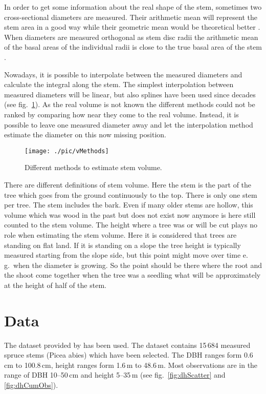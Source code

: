 \documentclass[twocolumn]{scrartcl}
\begin{document}
In order to get some information about the real shape of the stem, sometimes two
cross-sectional diameters are measured. Their arithmetic mean will represent the
stem area in a good way while their geometric mean would be theoretical better
\citep{Tischendorf1925holzmassenermittlung}. When diameters are measured
orthogonal as stem disc radii the arithmetic mean of the basal areas of the
individual radii is close to the true basal area of the stem
\citep{Siostrzonek1958grundflaechenzuwachs}.

Nowadays, it is possible to interpolate between the measured diameters and
calculate the integral along the stem. The simplest interpolation between
measured diameters will be linear, but also splines have been used since decades
(see fig.~\ref{fig:vMethods}). As the real volume is not known the different
methods could not be ranked by comparing how near they come to the real volume.
Instead, it is possible to leave one measured diameter away and let the
interpolation method estimate the diameter on this now missing position.

\begin{figure}[htbp]
  \centering
  \texttt{[image: ./pic/vMethods]}
  \caption{Different methods to estimate stem volume.}
  \label{fig:vMethods}
\end{figure}

There are different definitions of stem volume. Here the stem is the
part of the tree which goes from the ground continuously to the top. There is
only one stem per tree. The stem includes the bark. Even if many older stems are
hollow, this volume which was wood in the past but does not exist now anymore is
here still counted to the stem volume. The height where a tree was or will be
cut plays no role when estimating the stem volume. Here it is considered that
trees are standing on flat land. If it is standing on a slope the tree height is
typically measured starting from the slope side, but this point might move over
time e.\,g.\ when the diameter is growing. So the point should be there where
the root and the shoot come together when the tree was a seedling what will be
approximately at the height of half of the stem.


\section{Data}

The dataset provided by
\cite{Didion2024sectionWiseStemDiametersText,Didion2024sectionWiseStemDiametersData}
has been used. The dataset contains 15\,684 measured spruce stems (Picea abies)
which have been selected. The DBH ranges form 0.6\,cm to 100.8\,cm, height
ranges form 1.6\,m to 48.6\,m. Most observations are in the range of DBH
10--50\,cm and height 5--35\,m (see fig.~\ref{fig:dhScatter} and
\ref{fig:dhCumObs}).
\end{document}

